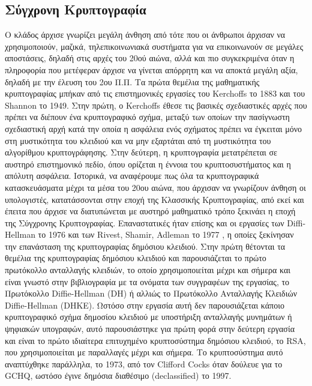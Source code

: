 \subsection{Σύγχρονη Κρυπτογραφία}
Ο κλάδος άρχισε γνωρίζει μεγάλη άνθηση από τότε που οι άνθρωποι άρχισαν να χρησιμοποιούν, μαζικά, τηλεπικοινωνιακά συστήματα για να επικοινωνούν σε μεγάλες αποστάσεις, δηλαδή στις αρχές του 20ού αιώνα, αλλά και πιο συγκεκριμένα όταν η πληροφορία που μετέφεραν άρχισε να γίνεται απόρρητη και να αποκτά μεγάλη αξία, δηλαδή με την έλευση του 2ου Π.Π. Τα πρώτα θεμέλια της μαθηματικής κρυπτογραφίας μπήκαν από τις επιστημονικές εργασίες του Kerchoffs \cite{kerckhoffs1883cryptographie} το 1883 και του Shannon \cite{shannon1945mathematical} το 1949. Στην πρώτη, ο Kerchoffs έθεσε τις βασικές σχεδιαστικές αρχές που πρέπει να διέπουν ένα κρυπτογραφικό σχήμα, μεταξύ των οποίων την πασίγνωστη σχεδιαστική αρχή κατά την οποία η ασφάλεια ενός σχήματος πρέπει να έγκειται μόνο στη μυστικότητα του κλειδιού και να μην εξαρτάται από τη μυστικότητα του αλγορίθμου κρυπτογράφησης. Στην δεύτερη, η κρυπτογραφία μετατρέπεται σε αυστηρό επιστημονικό πεδίο, όπου ορίζεται η έννοια του κρυπτοσυστήματος και η απόλυτη ασφάλεια. Ιστορικά, να αναφέρουμε πως όλα τα κρυπτογραφικά κατασκευάσματα μέχρι τα μέσα του 20ου αιώνα, που άρχισαν να γνωρίζουν άνθηση οι υπολογιστές, κατατάσσονται στην εποχή της Κλασσικής Κρυπτογραφίας, από εκεί και έπειτα που άρχισε να διατυπώνεται με αυστηρό μαθηματικό τρόπο ξεκινάει η εποχή της Σύγχρονης Κρυπτογραφίας. Επαναστατικές ήταν επίσης και οι εργασίες των Diffi-Hellman \cite{10.1109/TIT.1976.1055638} το 1976 και των Rivest, Shamir, Adleman το 1977 \cite{10.1145/359340.359342}, η οποίες ξεκίνησαν την επανάσταση της κρυπτογραφίας δημόσιου κλειδιού. Στην πρώτη θέτονται τα θεμέλια της κρυπτογραφίας δημόσιου κλειδιού και παρουσιάζεται το πρώτο πρωτόκολλο ανταλλαγής κλειδιών, το οποίο χρησιμοποιείται μέχρι και σήμερα και είναι γνωστό στην βιβλιογραφία με τα ονόματα των συγγραφέων της εργασίας, το Πρωτόκολλο Diffie-Hellman (DH) ή αλλιώς το Πρωτόκολλο Ανταλλαγής Κλειδιών Diffie-Hellman (DHKE). Ωστόσο στην εργασία αυτή δεν παρουσιάζεται κάποιο κρυπτογραφικό σχήμα δημοσίου κλειδιού με υποστήριξη ανταλλαγής μυνημάτων ή ψηφιακών υπογραφών, αυτό παρουσιάστηκε για πρώτη φορά στην δεύτερη εργασία και είναι το πρώτο ιδιαίτερα επιτυχημένο κρυπτοσύστημα δημόσιου κλειδιού, το RSA, που χρησιμοποιείται με παραλλαγές μέχρι και σήμερα. Το κρυπτοσύστημα αυτό αναπτύχθηκε παράλληλα, το 1973, από τον Clifford Cocks όταν δούλευε για το GCHQ, ωστόσο έγινε δημόσια διαθέσιμο (declassified) το 1997.

